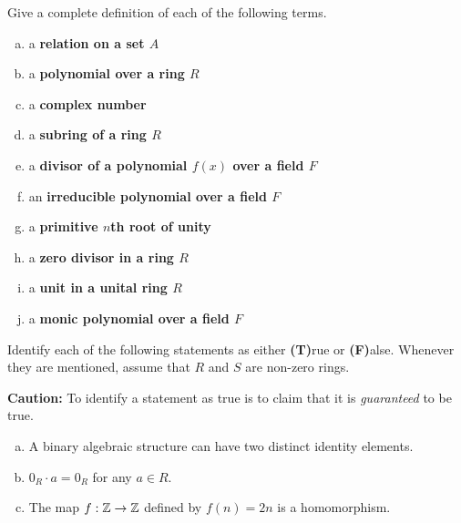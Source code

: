 \documentclass[11pt]{exam}
\begin{document}
\begin{questions}
\question[10] Give a complete definition of each of the following terms.

\begin{enumerate}[(a)]
\item a \bf relation \md on a set $A$
\vfill

\item a \bf polynomial \md over a ring $R$
\vfill

\item a \bf complex number \md
\vfill

\item a \bf subring \md of a ring $R$
\vfill

\item a \bf divisor \md of a polynomial $f(x)$ over a field $F$
\vfill
\newpage

\item an \bf irreducible \md polynomial over a field $F$
\vfill

\item a \bf primitive $n$th root of unity\md
\vfill

\item a \bf zero divisor \md in a ring $R$
\vfill

\item a \bf unit \md in a unital ring $R$
\vfill

\item a \bf monic \md polynomial over a field $F$
\vfill

\end{enumerate}
\newpage

\question[6] Identify each of the following statements as either \textbf{(T)}rue or \textbf{(F)}alse.  Whenever they are mentioned, assume that $R$ and $S$ are non-zero rings.

\noindent \textbf{Caution:} To identify a statement as true is to claim that it is \emph{guaranteed} to be true.
\vsp

\begin{enumerate}[(a)]
\item \underline{\hspace{1cm}} A binary algebraic structure can have two distinct identity elements.
\vsp

\item \underline{\hspace{1cm}} $0_{R}\cdot a = 0_{R}$ for any $a\in R$.
\vsp

\item \underline{\hspace{1cm}} The map $f:\mathbb{Z}\to \mathbb{Z}$ defined by $f(n) = 2n$ is a homomorphism.
\vsp


\end{enumerate}
\end{questions}
\end{document}
